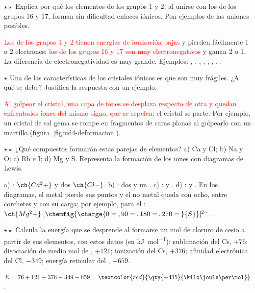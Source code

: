\begin{exercise}
    \(\star\star\) Explica por qué los elementos de los grupos 1 y 2, al unirse con los de los grupos 16 y 17, forman sin
    dificultad enlaces iónicos. Pon ejemplos de las uniones posibles.
    \begin{solu}
        \textcolor{red}{Los de los grupos 1 y 2 tienen energías de ionización bajas} y pierden fácilmente 1 o 2 electrones;
        \textcolor{red}{los de los grupos 16 y 17 son muy electronegativos} y ganan 2 o 1. La diferencia de electronegatividad es
        muy grande. Ejemplos: , , , , , , , .
    \end{solu}
\end{exercise}

\begin{exercise}
    \(\star\) Una de las características de los cristales iónicos es que son muy frágiles. ¿A qué se debe? Justifica la respuesta
    con un ejemplo.
    \begin{solu}
        \textcolor{red}{Al golpear el cristal, una capa de iones se desplaza respecto de otra y quedan enfrentados iones del mismo
        signo, que se repelen}: el cristal se parte. Por ejemplo, un cristal de sal gema se rompe en fragmentos de caras planas al
        golpearlo con un martillo (figura~\ref{fig:ud4-deformacion}).
    \end{solu}
\end{exercise}

\begin{exercise}
    \(\star\star\) ¿Qué compuestos formarán estas parejas de elementos? a) Ca y Cl; b) Na y O; c) Rb e I; d) Mg y S. Representa
    la formación de los iones con diagramas de Lewis.
    \begin{solu}
        a) \textcolor{red}{}: \(\ch{Ca^2+}\) y dos \(\ch{Cl-}\). b) \textcolor{red}{}: dos  y un
        . c) \textcolor{red}{}:  y . d) \textcolor{red}{}:  y . En los
        diagramas, el metal pierde sus puntos y el no metal queda con ocho, entre corchetes y con su carga; por ejemplo, para el
        : \(\ch{Mg^2+}\;[\chemfig{\charge{0=\:,90=\:,180=\:,270=\:}{S}}]^{2-}\).
    \end{solu}
\end{exercise}

\begin{exercise}
    \(\star\star\) Calcula la energía que se desprende al formarse un mol de cloruro de cesio a partir de sus elementos, con estos
    datos (en \unit{\kilo\joule\per\mol}): sublimación del Cs, \(+76\); disociación de medio mol de , \(+121\); ionización
    del Cs, \(+376\); afinidad electrónica del Cl, \(-349\); energía reticular del , \(-659\).
    \begin{solu}
        \(E = 76 + 121 + 376 - 349 - 659 = \textcolor{red}{\qty{-435}{\kilo\joule\per\mol}}\).
    \end{solu}
\end{exercise}


